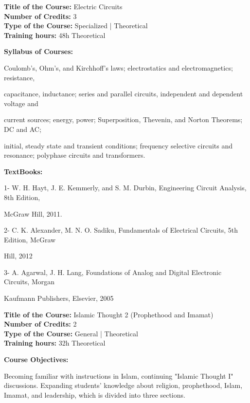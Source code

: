 \documentclass[12pt,a4paper]{article}
\begin{document}
\newpage
\textbf{Title of the Course:} Electric Circuits\\
\textbf{Number of Credits:} 3\\
\textbf{Type of the Course:} Specialized | Theoretical\\
\textbf{Training hours:} 48h Theoretical\par\vspace{4pt}
\textbf{Syllabus of Courses:}\par\vspace{2pt}
Coulomb's, Ohm's, and Kirchhoff’s laws; electrostatics and electromagnetics; resistance,\par
capacitance, inductance; series and parallel circuits, independent and dependent voltage and\par
current sources; energy, power; Superposition, Thevenin, and Norton Theorems; DC and AC;\par
initial, steady state and transient conditions; frequency selective circuits and resonance; polyphase circuits and transformers.\par\vspace{4pt}
\textbf{TextBooks:}\par\vspace{2pt}
1- W. H. Hayt, J. E. Kemmerly, and S. M. Durbin, Engineering Circuit Analysis, 8th Edition,\par
McGraw Hill, 2011.\par
2- C. K. Alexander, M. N. O. Sadiku, Fundamentals of Electrical Circuits, 5th Edition, McGraw\par
Hill, 2012\par
3- A. Agarwal, J. H. Lang, Foundations of Analog and Digital Electronic Circuits, Morgan\par
Kaufmann Publishers, Elsevier, 2005\par
\vspace{4pt}

\newpage
\nopagebreak
\textbf{Title of the Course:} Islamic Thought 2 (Prophethood and Imamat)\\
\textbf{Number of Credits:} 2\\
\textbf{Type of the Course:} General | Theoretical\\
\textbf{Training hours:} 32h Theoretical\par\vspace{4pt}
\textbf{Course Objectives:}\par\vspace{2pt}
Becoming familiar with instructions in Islam, continuing "Islamic Thought I" discussions.
Expanding students' knowledge about religion, prophethood, Islam, Imamat, and leadership,
which is divided into three sections.\par\vspace{4pt}
\end{document}
